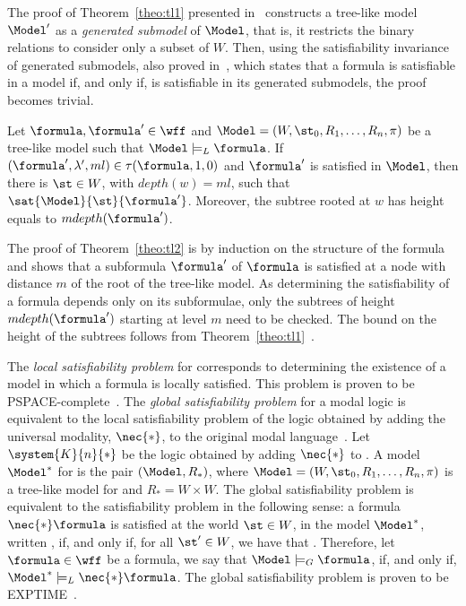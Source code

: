 \begin{example}
    The proof of Theorem~\ref{theo:tl1} presented in~\cite{blackburn2002modal}
    constructs a tree-like model $\Model'$ as a \emph{generated submodel} of
    $\Model$, that is, it restricts the binary relations to consider only a
    subset of $W$. Then, using the satisfiability invariance of generated
    submodels, also proved in~\cite{blackburn2002modal}, which states that a
    formula is satisfiable in a model if, and only if, is satisfiable in its
    generated submodels, the proof becomes trivial.

    \begin{theorem}%
        \label{theo:tl2}
        Let $\formula, \formula' \in \wff$ and $\Model = (W, \st_0, R_1, \ldots,
        R_n, \pi)$ be a tree-like model such that $\Model \models_L \formula$. If
        $(\formula', \lambda', ml) \in \tau(\formula, 1, 0)$ and
        $\formula'$ is satisfied in $\Model$, then there is $\st \in W$, with
        $depth(w) = ml$, such that $\sat{\Model}{\st}{\formula'}$. Moreover,
        the subtree rooted at $w$ has height equals to $mdepth(\formula')$.
    \end{theorem}

    The proof of Theorem~\ref{theo:tl2} is by induction on the structure of the
    formula and shows that a subformula $\formula'$ of $\formula$ is satisfied
    at a node with distance $m$ of the root of the tree-like model. As
    determining the satisfiability of a formula depends only on its subformulae,
    only the subtrees of height $mdepth(\formula')$ starting at level $m$ need
    to be checked. The bound on the height of the subtrees follows from
    Theorem~\ref{theo:tl1}~\cite{nalon2015modal}.
\end{example}

The \emph{local satisfiability problem} for  corresponds to
determining the existence of a model in which a formula is locally satisfied.
This problem is proven to be PSPACE-complete~\cite{Spaan:coml}. The
\emph{global satisfiability problem} for a modal logic is equivalent to the
local satisfiability problem of the logic obtained by adding the universal
modality, $\nec{*}$, to the original modal language~\cite{goranko1992using}. Let
$\system{K}{n}{*}$ be the logic obtained by adding $\nec{*}$ to .
A model $\Model^*$ for  is the pair $(\Model, R_*)$, where
$\Model = (W, \st_0, R_1, \ldots, R_n, \pi)$ is a tree-like model for
 and $R_* = W \times W$. The global satisfiability problem is
equivalent to the satisfiability problem in the following sense: a formula
$\nec{*} \formula$ is satisfied at the world $\st \in W$, in the model
$\Model^*$, written \sat{\Model^*}{\st}{\nec{*}\formula}, if, and only if, for
all $\st' \in W$, we have that . Therefore, let
$\formula \in \wff$ be a formula, we say that $\Model \models_G \formula$, if,
and only if, $\Model^* \models_L \nec{*} \formula$. The global satisfiability
problem is proven to be EXPTIME~\cite{Spaan:coml}.

